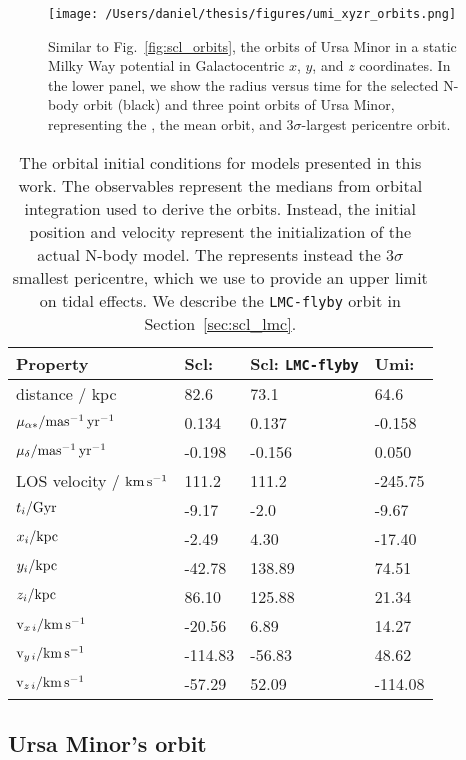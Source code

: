 \begin{figure}
\centering
\texttt{[image: /Users/daniel/thesis/figures/umi\_xyzr\_orbits.png]}
\caption[Ursa Minor's possible orbits]{Similar to
Fig.~\ref{fig:scl_orbits}, the orbits of Ursa Minor in a static Milky
Way potential in Galactocentric \(x\), \(y\), and \(z\) coordinates. In
the lower panel, we show the radius versus time for the selected
\smallperi{} N-body orbit (black) and three point orbits of Ursa Minor,
representing the \smallperi{}, the mean orbit, and \(3\sigma\)-largest
pericentre orbit.}\label{fig:umi_orbits}
\end{figure}

\begin{table*}[t]
\centering
\caption[Orbit initial conditions]{The orbital initial conditions for models presented in this work. The observables represent the medians from orbital integration used to derive the orbits. Instead, the initial position and velocity represent the initialization of the actual N-body model. The \smallperi{} represents instead the $3\sigma$ smallest pericentre, which we use to provide an upper limit on tidal effects. We describe the \texttt{LMC-flyby} orbit in Section \ref{sec:scl_lmc}. }
\label{tbl:orbit_ics}
\begin{tabular}{llll}
\toprule
Property & Scl: \smallperi{} & Scl: \verb|LMC-flyby| & Umi: \smallperi{}\\
\midrule
distance / kpc & 82.6 & 73.1 & 64.6\\
$\mu_{\alpha*} / {\rm mas^{-1}\,yr^{-1}}$ & 0.134 & 0.137 & -0.158\\
$\mu_{\delta} / {\rm mas^{-1}\,yr^{-1}}$ & -0.198 & -0.156 & 0.050\\
LOS velocity / ${\rm km\,s^{-1}}$ & 111.2 & 111.2 & -245.75\\
$t_i / {\rm Gyr}$ & -9.17 & -2.0 & -9.67\\
${x}_{i} / {\rm kpc}$ & -2.49 & 4.30 & -17.40\\
${y}_{i} / {\rm kpc}$ & -42.78 & 138.89 & 74.51\\
${z}_{i} / {\rm kpc}$ & 86.10 & 125.88 & 21.34\\
${\rm v}_{x\,i} / {\rm km\,s^{-1}}$ & -20.56 & 6.89 & 14.27\\
${\rm v}_{y\,i} / {\rm km\,s^{-1}}$ & -114.83 & -56.83 & 48.62\\
${\rm v}_{z\,i} / {\rm km\,s^{-1}}$ & -57.29 & 52.09 & -114.08\\
\bottomrule
\end{tabular}
\end{table*}

\subsection{Ursa Minor's orbit}\label{sec:orbit_corrections}

